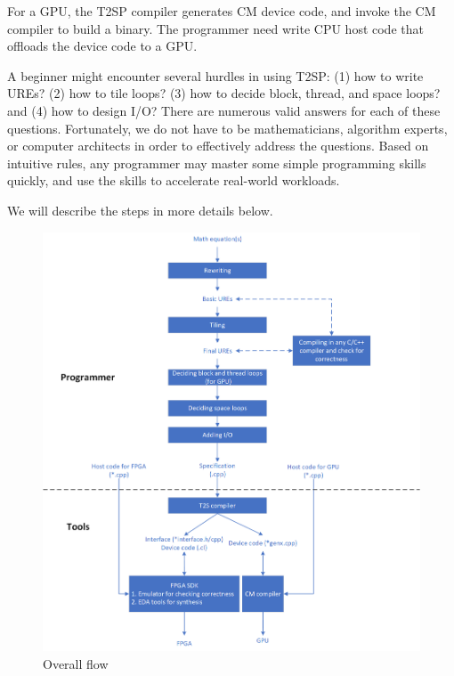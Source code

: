 For a GPU, the T2SP compiler generates CM device code, and invoke the CM compiler to build a binary. The programmer need write CPU host code that offloads the device code to a GPU. 

A beginner might encounter several hurdles in using T2SP: (1) how to write UREs? (2) how to tile loops? (3) how to decide block, thread, and space loops? and (4) how to design I/O? There are numerous valid answers for each of these questions. Fortunately, we do not have to be mathematicians, algorithm experts, or computer architects in order to effectively address the questions. Based on intuitive rules, any programmer may master some simple programming skills quickly, and  use the skills to accelerate real-world workloads.

We will describe the steps in more details below. 

\begin{figure}[!ht]
    \centering
    \includegraphics[width=\textwidth]{img/overall-flow.png}
    \caption{Overall flow}
    \label{fig:overall-flow}
\end{figure}
